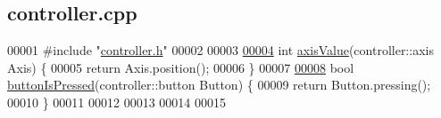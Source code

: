 \hypertarget{controller_8cpp_source}{}\subsection{controller.\+cpp}
\label{controller_8cpp_source}

\begin{DoxyCode}
00001 \textcolor{preprocessor}{#include "\mbox{\hyperlink{controller_8h}{controller.h}}"}
00002 
00003 
\mbox{\hyperlink{controller_8cpp_a73be3a8649e7d561a68cd816420efbd9_a73be3a8649e7d561a68cd816420efbd9}{00004}} \textcolor{keywordtype}{int} \mbox{\hyperlink{controller_8cpp_a73be3a8649e7d561a68cd816420efbd9_a73be3a8649e7d561a68cd816420efbd9}{axisValue}}(controller::axis Axis) \{
00005   \textcolor{keywordflow}{return} Axis.position();
00006 \}
00007 
\mbox{\hyperlink{controller_8cpp_aff3b02388de758f0fe6d98930ea57626_aff3b02388de758f0fe6d98930ea57626}{00008}} \textcolor{keywordtype}{bool} \mbox{\hyperlink{controller_8cpp_aff3b02388de758f0fe6d98930ea57626_aff3b02388de758f0fe6d98930ea57626}{buttonIsPressed}}(controller::button Button) \{
00009   \textcolor{keywordflow}{return} Button.pressing();
00010 \}
00011 
00012 
00013 
00014 
00015  
\end{DoxyCode}
